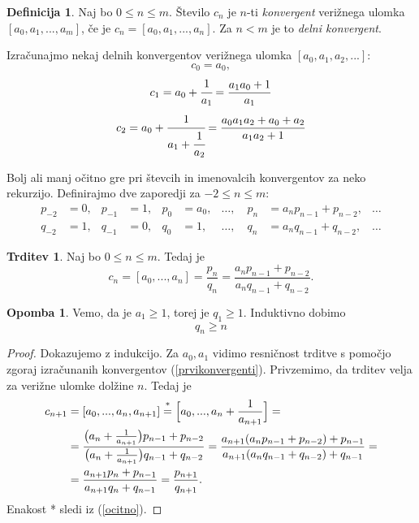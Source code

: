 \documentclass[a4paper,12pt]{article}
\newcommand{\equaltext}[1]{\ensuremath{\stackrel{\text{#1}}{=}}}
\theoremstyle{definition}
\newtheorem{df}{Definicija}[section]
\theoremstyle{proposition}
\newtheorem{trd}{Trditev}[section]
\theoremstyle{theorem}
\theoremstyle{lemma}
\newtheorem*{op}{Opomba}
\begin{document}
\begin{df}
Naj bo $0 \leq n \leq m$. Število $c_n$ je $n$-ti \textit{konvergent} 		verižnega ulomka $[a_0, a_1, ..., a_m]$, če je $c_n = [a_0, a_1, ..., a_n]$. Za $n < m$ je to \textit{delni konvergent}.
\end{df}

Izračunajmo nekaj delnih konvergentov verižnega ulomka $[a_0, a_1, a_2, ...]$: 
\begin{equation*}
c_0=a_0,
\end{equation*}
\begin{equation}
\label{prvikonvergenti}
c_1=a_0+\cfrac{1}{a_1}=\frac{a_1 a_0 + 1}{a_1}
\end{equation}
\begin{equation*}
c_2 = a_0 + \cfrac{1}{a_1 + \cfrac{1}{a_2}} =\frac{a_0 a_1 a_2 + a_0 + a_2}{a_1 a_2 + 1}
\end{equation*}

Bolj ali manj očitno gre pri števcih in imenovalcih konvergentov za neko rekurzijo. Definirajmo dve zaporedji za $-2\leq n \leq m$:
\begin{align*}
		p_{-2} &= 0, & p_{-1} &= 1, & p_0 &= a_0, & \dots, \quad p_n &= a_{n}p_{n-1} + p_{n-2}, & \dots \\
		q_{-2} &= 1, & q_{-1} &= 0, & q_0 &= 1, & \dots, \quad q_n &= a_{n}q_{n-1} + q_{n-2}, & \dots
\end{align*}
		
\begin{trd}
Naj bo $0\leq n \leq m$. Tedaj je
\begin{equation}
\label{pninqn}
c_n = [a_0, ..., a_n] = \frac{p_n}{q_n} = \frac{a_{n}p_{n-1} + p_{n-2}}{a_{n}q_{n-1} + q_{n-2}}.
\end{equation}
\end{trd}

\begin{op}
Vemo, da je $a_1 \geq 1$, torej je $q_1 \geq 1$. Induktivno dobimo
\begin{equation}
\label{ocenaimenovalca}
q_n \geq n
\end{equation}
\end{op}

\begin{proof}
Dokazujemo z indukcijo. Za $a_0, a_1$ vidimo resničnost trditve s pomočjo zgoraj izračunanih konvergentov (\ref{prvikonvergenti}). Privzemimo, da trditev velja za verižne ulomke dolžine $n$. Tedaj je
\begin{equation*}
\begin{split}
c_{n+1}&=[a_0, ...,a_n, a_{n+1}]
\equaltext{\text{*}}{} \Big[a_0, ..., a_n + \frac{1}{a_{n+1}}\Big] =\\
&= \frac{\big(a_n + \frac{1}{a_{n+1}}\big)p_{n-1}+p_{n-2}}{\big(a_n + \frac{1}{a_{n+1}}\big)q_{n-1}+q_{n-2}} =
\frac{a_{n+1}(a_n p_{n-1} + p_{n-2}) + p_{n-1}}{a_{n+1}(a_n q_{n-1} + q_{n-2}) + q_{n-1}} =\\
&=\frac{a_{n+1}p_n + p_{n-1}}{a_{n+1}q_n + q_{n-1}} = \frac{p_{n+1}}{q_{n+1}}.
\end{split}
\end{equation*}
Enakost * sledi iz (\ref{ocitno}).
\end{proof}
\end{document}
